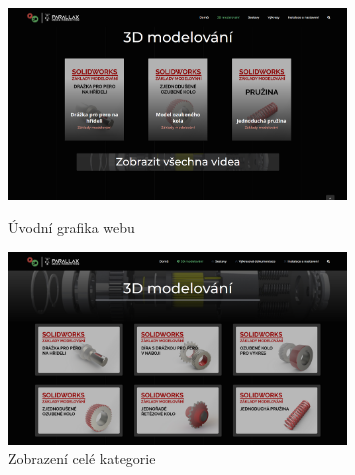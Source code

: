 \begin{figure}[htbp]
    \centering
    \begin{minipage}[b]{0.45\textwidth}
        \centering
        \includegraphics[width=0.8\textwidth]{img/020/web/web-hp3.png}
        \caption{Úvodní grafika webu}
        \label{fig:p3dportal-hp3}
    \end{minipage}
    \qquad
    \begin{minipage}[b]{0.45\textwidth}
        \centering
        \includegraphics[width=0.8\textwidth]{img/020/web/web-cat.png}
        \caption{Zobrazení celé kategorie}
        \label{fig:p3dportal-cat}
    \end{minipage}
\end{figure}

